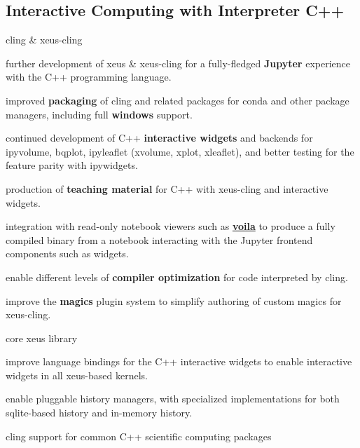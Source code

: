 \begin{task}[title=Interactive C++ in Jupyter with XEUS,
  id=xeus-cpp,
  lead=QS,
  PM=12,
  wphases={0-48},
  partners={QS,UPSUD}
]
\hypertarget{interactive-computing-with-interpreter-c}{%
\section{Interactive Computing with Interpreter
C++}\label{interactive-computing-with-interpreter-c}}

\begin{compactenum}
\item
  cling \& xeus-cling

  \begin{compactenum}
  \item
    further development of xeus \& xeus-cling for a fully-fledged
    \textbf{Jupyter} experience with the C++ programming language.
  \item
    improved \textbf{packaging} of cling and related packages for conda
    and other package managers, including full \textbf{windows} support.
  \item
    continued development of C++ \textbf{interactive widgets} and
    backends for ipyvolume, bqplot, ipyleaflet (xvolume, xplot,
    xleaflet), and better testing for the feature parity with
    ipywidgets.
  \item
    production of \textbf{teaching material} for C++ with xeus-cling and
    interactive widgets.
  \item
    integration with read-only notebook viewers such as
    \href{https://github.com/QuantStack/voila}{\textbf{voila}} to
    produce a fully compiled binary from a notebook interacting with the
    Jupyter frontend components such as widgets.
  \item
    enable different levels of \textbf{compiler optimization} for code
    interpreted by cling.
  \item
    improve the \textbf{magics} plugin system to simplify authoring of
    custom magics for xeus-cling.
  \end{compactenum}
\item
  core xeus library

  \begin{compactenum}
  \item
    improve language bindings for the C++ interactive widgets to enable
    interactive widgets in all xeus-based kernels.
  \item
    enable pluggable history managers, with specialized implementations
    for both sqlite-based history and in-memory history.
  \end{compactenum}
\item
  cling support for common C++ scientific computing packages


\end{compactenum}
\end{task}
